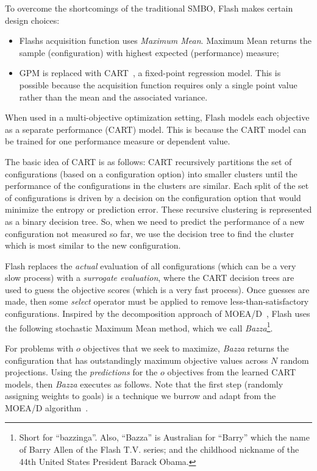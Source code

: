 \documentclass[10pt,journal,compsoc]{IEEEtran}
\newcommand{\flash}{{\sc Flash}\xspace}
\begin{document}
To overcome the shortcomings of the traditional SMBO, \flash makes certain design choices:
\begin{itemize}[leftmargin=*]
    \item {\sc Flash}\textquotesingle s acquisition function uses  \textit{Maximum Mean}. Maximum Mean returns the sample (configuration) with highest expected (performance) measure;
    \item GPM is replaced with CART~\cite{breiman1984classification}, a fixed-point regression model. This is possible because the acquisition function requires only a single point value rather than the mean and the associated variance. 
\end{itemize}
When used in a multi-objective optimization setting, \flash models each objective as a separate performance (CART) model. This is because the CART model can be trained for one performance measure or dependent value. 

The basic idea of CART is as follows: CART recursively partitions the set of configurations (based on a configuration option) into smaller clusters until the performance of the configurations in the clusters are similar. 
Each split of the set of configurations is driven by a decision on the configuration option that would minimize the entropy or prediction error.
These recursive clustering is represented as a binary decision tree. So, when we need to predict the performance of a new configuration not measured so far, we use the decision tree to find the cluster which is most similar to the new configuration.

\flash replaces the {\em actual} evaluation of all configurations (which can be a very slow process) with a {\em surrogate evaluation}, where the CART decision trees are used to guess
the objective scores (which is a very fast process). Once guesses are made,
then some {\em select} operator must be applied to remove less-than-satisfactory configurations.
Inspired by the
 decomposition approach of MOEA/D~\cite{zhang2007moea}, \flash uses
 the   following 
 stochastic Maximum Mean method, which we call {\em Bazza}\footnote{Short for ``bazzinga''.
Also, ``Bazza'' is Australian for ``Barry''
which the name of Barry Allen of the Flash T.V. series;
 and the childhood nickname of the 44th  United States President Barack Obama.}.

 For problems with $o$ objectives that we seek to maximize,
 {\em Bazza} returns the configuration that has outstandingly maximum objective values across $N$ random projections. Using the {\em predictions}
for the $o$ objectives from the learned CART models,
then {\em Bazza} executes as follows.  Note that the first step (randomly assigning weights to goals)
is a technique we burrow and adapt from the MOEA/D algorithm~\cite{zhang2007moea}.
\end{document}
